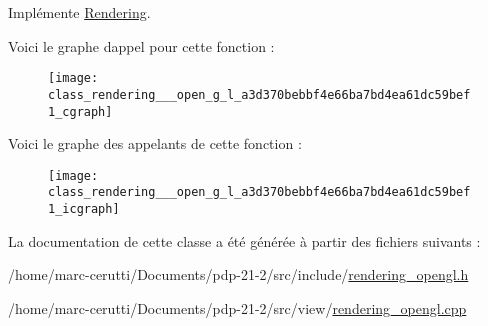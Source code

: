 Implémente \hyperlink{class_rendering_a09a77bbedf75aff7535c419b6f8e4915}{Rendering}.

Voici le graphe d\textquotesingle{}appel pour cette fonction \+:\nopagebreak
\begin{figure}[H]
\begin{center}
\leavevmode
\texttt{[image: class\_rendering\_\_\_open\_g\_l\_a3d370bebbf4e66ba7bd4ea61dc59bef1\_cgraph]}
\end{center}
\end{figure}
Voici le graphe des appelants de cette fonction \+:\nopagebreak
\begin{figure}[H]
\begin{center}
\leavevmode
\texttt{[image: class\_rendering\_\_\_open\_g\_l\_a3d370bebbf4e66ba7bd4ea61dc59bef1\_icgraph]}
\end{center}
\end{figure}


La documentation de cette classe a été générée à partir des fichiers suivants \+:\begin{DoxyCompactItemize}
\item 
/home/marc-\/cerutti/\+Documents/pdp-\/21-\/2/src/include/\hyperlink{rendering__opengl_8h}{rendering\+\_\+opengl.\+h}\item 
/home/marc-\/cerutti/\+Documents/pdp-\/21-\/2/src/view/\hyperlink{rendering__opengl_8cpp}{rendering\+\_\+opengl.\+cpp}\end{DoxyCompactItemize}
